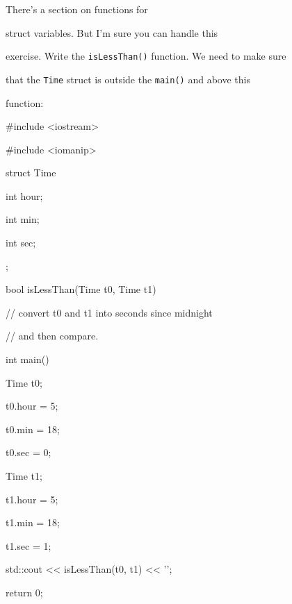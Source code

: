 There's a section on functions for

struct variables. But I'm sure you can handle this

exercise. Write the \texttt{isLessThan()} function. We need to make sure

that the \texttt{Time} struct is outside the \texttt{main()} and above this

function:



\begin{consolethree}[escapeinside=||]

#include <iostream>

#include <iomanip>



struct Time

{

    int hour;

    int min;

    int sec;

};



bool isLessThan(Time t0, Time t1)

{

    // convert t0 and t1 into seconds since midnight

    // and then compare.

}



int main()

{

    Time t0;

    t0.hour = 5;

    t0.min = 18;

    t0.sec = 0;



    Time t1;

    t1.hour = 5;

    t1.min = 18;

    t1.sec = 1;



    std::cout << isLessThan(t0, t1) << '\n';

    return 0;

}

\end{consolethree}

